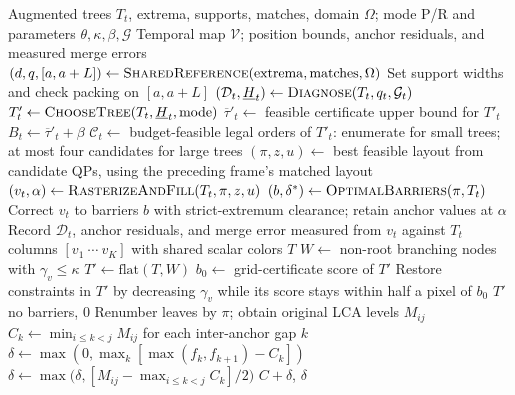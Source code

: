 \begin{algorithm}[t]
\caption{Reference-guided temporal merge tree maps.}\label{alg:rgmtm}
\small
{}
\begin{algorithmic}
\Require Augmented trees $T_t$, extrema, supports, matches, domain $\Omega$; mode P/R and parameters $\theta,\kappa,\beta,\mathcal G$
\Ensure Temporal map $\mathcal V$; position bounds, anchor residuals, and measured merge errors
 \State $(d,q,[a,a+L])\gets\Call{SharedReference}{\mathrm{extrema},\mathrm{matches},\Omega}$
  \State Set support widths and check packing on $[a,a+L]$
  \State $(\mathcal D_t,\underline H_t)\gets\Call{Diagnose}{T_t,q_t,\mathcal G_t}$
  \State $T'_t\gets\Call{ChooseTree}{T_t,\underline H_t,\mathrm{mode}}$
  \State $\overline\tau'_t\gets$ feasible certificate upper bound for $T'_t$
  \State $B_t\gets\overline\tau'_t+\beta$
  \State $\mathcal C_t\gets$ budget-feasible legal orders of $T'_t$: enumerate for small trees; at most four candidates for large trees
  \State $(\pi,z,u)\gets$ best feasible layout from candidate QPs, using the preceding frame's matched layout
  \State $(v_t,\alpha)\gets\Call{RasterizeAndFill}{T_t,\pi,z,u}$
   \State $(b,\delta^*)\gets\Call{OptimalBarriers}{\pi,T_t}$
   \State Correct $v_t$ to barriers $b$ with strict-extremum clearance; retain anchor values at $\alpha$
  \EndIf
  \State Record $\mathcal D_t$, anchor residuals, and merge error measured from $v_t$ against $T_t$
 \EndFor
 \State \Return columns $[v_1\ \cdots\ v_K]$ with shared scalar colors
\EndFunction
\Statex
{}
  \State \Return $T$ \EndIf
 \State $W\gets$ non-root branching nodes with $\gamma_v\le\kappa$
 \State $T'\gets\mathrm{flat}(T,W)$
  \State $b_0\gets$ grid-certificate score of $T'$
  \State Restore constraints in $T'$ by decreasing $\gamma_v$ while its score stays within half a pixel of $b_0$
 \EndIf
 \State \Return $T'$
\EndFunction
\Statex
{}
  \State \Return no barriers, $0$ \EndIf
 \State Renumber leaves by $\pi$; obtain original LCA levels $M_{ij}$
 \State $C_k\gets\min_{i\le k<j}M_{ij}$ for each inter-anchor gap $k$
 \State $\delta\gets\max(0,\max_k[\max(f_k,f_{k+1})-C_k])$
  \State $\delta\gets\max\bigl(\delta,[M_{ij}-\max_{i\le k<j}C_k]/2\bigr)$
 \EndFor
 \State \Return $C+\delta$, $\delta$
\EndFunction
\end{algorithmic}
\end{algorithm}
